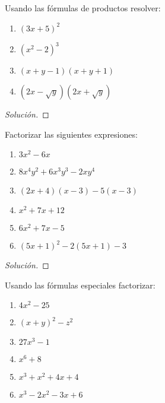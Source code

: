\documentclass[a4,11pt]{aleph-notas}
\begin{document}
\begin{ejer}
	Usando las f\'ormulas de productos resolver:
	\begin{multicols}{2}
	\begin{enumerate}[label=\textit{\alph*)}]
		\item $(3x+5)^2$
		\item $(x^2 - 2)^3$
		\item $(x+y-1)(x+y + 1)$
		\item $(2x - \sqrt{y})(2x + \sqrt{y})$
	\end{enumerate}
	\end{multicols}
\end{ejer}

\begin{proof}[Solución]\hspace{0pt}
    
\end{proof}

\begin{ejer}
    Factorizar las siguientes expresiones:
    \begin{multicols}{2}
    \begin{enumerate}[label=\textit{\alph*)}]
        \item $3x^2 - 6x$
        \item $8x^4y^2+6x^3y^3-2xy^4$
        \item $(2x+4)(x-3)-5(x-3)$
        \item $x^2+7x+12$
        \item $6x^2 + 7x - 5$
        \item $(5x+1)^2 - 2(5x+1) - 3$
    \end{enumerate}
    \end{multicols}
    \vspace{0pt}
\end{ejer}

\begin{proof}[Solución]\hspace{0pt}
    
\end{proof}


\begin{ejer}
    Usando las f\'ormulas especiales factorizar:
    \begin{multicols}{2}
    \begin{enumerate}[label=\textit{\alph*)}]
        \item $4x^2 - 25$
        \item $(x+y)^2 - z^2$
        \item $27x^3 - 1$
        \item $x^6 + 8$
        \item $x^3 + x^2 + 4x + 4$
        \item $x^3 - 2x^2 - 3x + 6$
    \end{enumerate}
    \end{multicols}
    \vspace{0pt}
\end{ejer}
\end{document}
